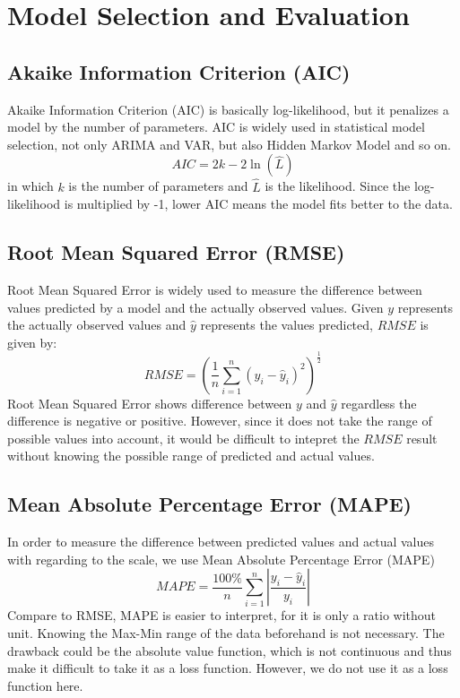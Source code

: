 \documentclass[11pt]{article}
\begin{document}
\section{Model Selection and Evaluation}
\subsection{Akaike Information Criterion (AIC)}
Akaike Information Criterion (AIC) is basically log-likelihood, but it penalizes
a model by the number of parameters. AIC is widely used in statistical model
selection, not only ARIMA and VAR, but also Hidden Markov Model and so on.
$$
AIC = 2k -2\ln(\hat{L})
$$
in which $k$ is the number of parameters and $\hat{L}$ is the likelihood. Since
the log-likelihood is multiplied by -1, lower AIC means the model fits better to
the data.

\subsection{Root Mean Squared Error (RMSE)}
Root Mean Squared Error is widely used to measure the difference between values
predicted by a model and the actually observed values. Given $y$ represents the
actually observed values and $\hat{y}$ represents the values predicted, $RMSE$
is given by:
$$
RMSE = \left( \frac{1}{n}\sum _{i=1}^{n}(y_i -\hat{y}_i)^2 \right)^\frac{1}{2}
$$
Root Mean Squared Error shows difference between $y$ and $\hat{y}$ regardless
the difference is negative or positive. However, since it does not take the
range of possible values into account, it would be difficult to intepret the
$RMSE$ result without knowing the possible range of predicted and actual values.

\subsection{Mean Absolute Percentage Error (MAPE)}
In order to measure the difference between predicted values and actual values
with regarding to the scale, we use Mean Absolute Percentage Error (MAPE)
$$
MAPE = \frac{100\%}{n}\sum  _{i=1}^{n}\left| \frac{y_i -\hat{y}_i}{y_i} \right|
$$
Compare to RMSE, MAPE is easier to interpret, for it is only a ratio without
unit. Knowing the Max-Min range of the data beforehand is not necessary. The
drawback could be the absolute value function, which is not continuous and thus
make it difficult to take it as a loss function. However, we do not use it as a
loss function here.
\end{document}
